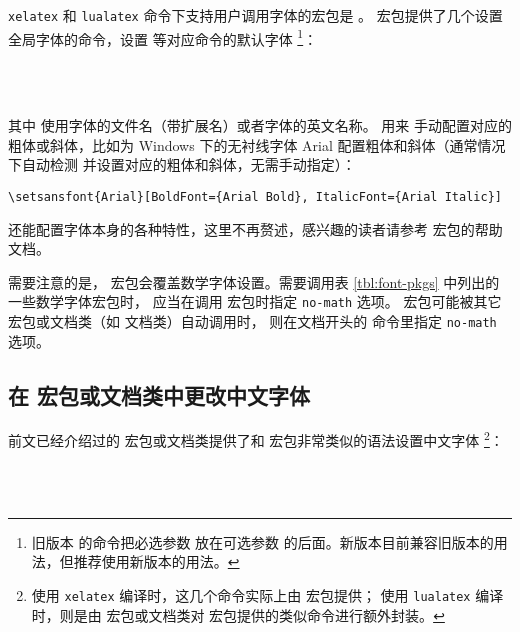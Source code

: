 \texttt{xelatex} 和 \texttt{lualatex} 命令下支持用户调用字体的宏包是 。
宏包提供了几个设置全局字体的命令，设置  等对应命令的默认字体%
\footnote{旧版本  的命令把必选参数  放在可选参数  的后面。新版本目前兼容旧版本的用法，但推荐使用新版本的用法。}：
\begin{command}
 \\
 \\
\end{command}
其中  使用字体的文件名（带扩展名）或者字体的英文名称。 用来
手动配置对应的粗体或斜体，比如为 Windows 下的无衬线字体 Arial 配置粗体和斜体（通常情况下自动检测
并设置对应的粗体和斜体，无需手动指定）：
\begin{verbatim}
\setsansfont{Arial}[BoldFont={Arial Bold}, ItalicFont={Arial Italic}]
\end{verbatim}
 还能配置字体本身的各种特性，这里不再赘述，感兴趣的读者请参考  宏包的帮助文档。

需要注意的是， 宏包会覆盖数学字体设置。需要调用表 \ref{tbl:font-pkgs} 中列出的一些数学字体宏包时，
应当在调用  宏包时指定 \texttt{no-math} 选项。 宏包可能被其它宏包或文档类（如  文档类）自动调用时，
则在文档开头的  命令里指定 \texttt{no-math} 选项。

\subsection{在  宏包或文档类中更改中文字体}\label{subsec:CJKfont}

前文已经介绍过的  宏包或文档类提供了和  宏包非常类似的语法设置中文字体%
\footnote{使用 \texttt{xelatex} 编译时，这几个命令实际上由  宏包提供；
使用 \texttt{lualatex} 编译时，则是由  宏包或文档类对  宏包提供的类似命令进行额外封装。}：
\begin{command}
 \\
 \\
\end{command}

